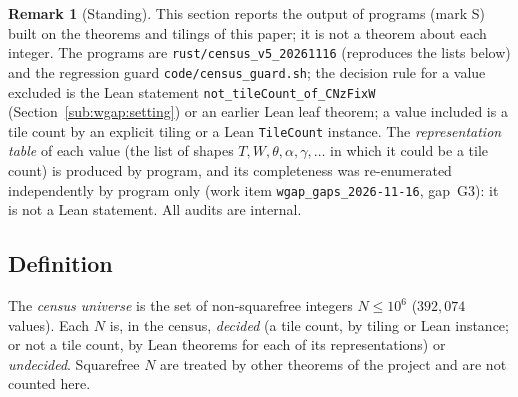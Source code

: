 \documentclass[11pt,reqno]{amsart}
\theoremstyle{plain}
\theoremstyle{definition}
\newtheorem{remark}[theorem]{Remark}
\newcommand{\sS}{\textup{\textsf{S}}}
\newcommand{\rec}[1]{\textup{\texttt{#1}}}
\begin{document}
\begin{remark}[Standing]\label{rem:cen:status}
This section reports the output of programs (mark \sS) built on the theorems and tilings of this paper; it is not a
theorem about each integer. The programs are \rec{rust/census\_v5\_20261116} (reproduces the lists below) and the
regression guard \rec{code/census\_guard.sh}; the decision rule for a value excluded is the Lean statement
\texttt{not\_tileCount\_of\_CNzFixW} (Section~\ref{sub:wgap:setting}) or an earlier Lean leaf theorem; a value
included is a tile count by an explicit tiling or a Lean \texttt{TileCount} instance. The
\emph{representation table} of each value (the list of shapes $T,W,\theta,\alpha,\gamma,\dots$ in which it could be a
tile count) is produced by program, and its completeness was re-enumerated independently by program only
(work item \rec{wgap\_gaps\_2026-11-16}, gap~G3): it is not a Lean statement. All audits are internal.
\end{remark}

\subsection{Definition}\label{sub:cen:def}
The \emph{census universe} is the set of non-squarefree integers $N\le10^6$ ($392{,}074$ values). Each $N$ is, in
the census, \emph{decided} (a tile count, by tiling or Lean instance; or not a tile count, by Lean theorems for each
of its representations) or \emph{undecided}. Squarefree $N$ are treated by other theorems of the project and are not
counted here.
\end{document}
